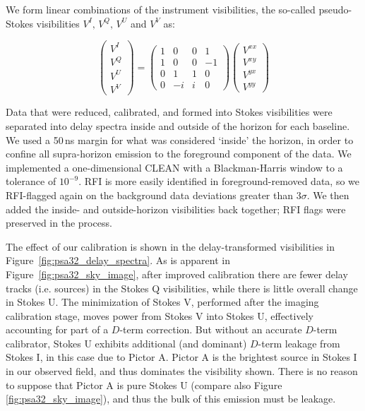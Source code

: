 We form linear combinations of the instrument visibilities, the so-called pseudo-Stokes visibilities \citep[see e.g.][]{Moore.13} $V^I,\,V^Q,\,V^U$ and $V^V$ as:

\begin{equation}
\left(\begin{array}{c}
V^{I}\\
V^{Q}\\
V^{U}\\
V^{V}\end{array} \right)
=
\left( \begin{array}{cccc}
1 & 0 & 0 & 1 \\
1 & 0 & 0 & -1 \\
0 & 1 & 1 & 0 \\
0 & -i & i & 0 \end{array} \right) 
\left(\begin{array}{c}
V^{xx}\\
V^{xy}\\
V^{yx}\\
V^{yy}\end{array} \right) 
\label{eq:psa32_stokes}
\end{equation}

Data that were reduced, calibrated, and formed into Stokes visibilities were separated into delay spectra inside and outside of the horizon for each baseline. We used a 50\,ns margin for what was considered `inside' the horizon, in order to confine all supra-horizon emission \citep[e.g.][]{Parsons.12a, Pober.13} to the foreground component of the data. We implemented a one-dimensional CLEAN \citep{ParsonsBacker.09, Parsons.12b} with a Blackman-Harris window to a tolerance of $10^{-9}$. RFI is more easily identified in foreground-removed data, so we RFI-flagged again on the background data deviations greater than $3\sigma$. We then added the inside- and outside-horizon visibilities back together; RFI flags were preserved in the process. 

The effect of our calibration is shown in the delay-transformed visibilities in Figure~\ref{fig:psa32_delay_spectra}. As is apparent in Figure~\ref{fig:psa32_sky_image}, after improved calibration there are fewer delay tracks (i.e. sources) in the Stokes Q visibilities, while there is little overall change in Stokes U. The minimization of Stokes V, performed after the imaging calibration stage, moves power from Stokes V into Stokes U, effectively accounting for part of a $D$-term correction. But without an accurate $D$-term calibrator, Stokes U exhibits additional (and dominant) $D$-term leakage from Stokes I, 
in this case due to Pictor A. Pictor A is the brightest source in Stokes I in our observed field, and thus dominates the visibility shown.  There is no reason to suppose that Pictor A is pure Stokes U (compare also Figure \ref{fig:psa32_sky_image}), and thus the bulk of this emission must be leakage.

